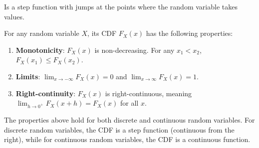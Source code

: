\documentclass[
  letterpaper,
  DIV=11,
  numbers=noendperiod]{scrreport}
\providecommand{\tightlist}{%
  \setlength{\itemsep}{0pt}\setlength{\parskip}{0pt}}
\theoremstyle{definition}
\theoremstyle{plain}
\theoremstyle{plain}
\theoremstyle{definition}
\theoremstyle{remark}
\begin{document}
Is a step function with jumps at the points where the random variable
takes values.

\begin{tcolorbox}[enhanced jigsaw, opacitybacktitle=0.6, bottomtitle=1mm, opacityback=0, toprule=.15mm, colbacktitle=quarto-callout-note-color!10!white, colback=white, left=2mm, title={Properties of Cumulative Distribution Functions}, breakable, rightrule=.15mm, leftrule=.75mm, titlerule=0mm, colframe=quarto-callout-note-color-frame, arc=.35mm, coltitle=black, toptitle=1mm, bottomrule=.15mm]

\label{properties-cdf}
For any random variable \(X\), its CDF \(F_X(x)\) has the following
properties:

\begin{enumerate}
\def\labelenumi{\arabic{enumi}.}
\tightlist
\item
  \textbf{Monotonicity}: \(F_X(x)\) is non-decreasing. For any
  \(x_1 < x_2\), \(F_X(x_1) \le F_X(x_2)\).
\item
  \textbf{Limits}: \(\lim_{x \to -\infty} F_X(x) = 0\) and
  \(\lim_{x \to \infty} F_X(x) = 1\).
\item
  \textbf{Right-continuity}: \(F_X(x)\) is right-continuous, meaning
  \(\lim_{h \to 0^+} F_X(x+h) = F_X(x)\) for all \(x\).
\end{enumerate}

\end{tcolorbox}

The properties above hold for both discrete and continuous random
variables. For discrete random variables, the CDF is a step function
(continuous from the right), while for continuous random variables, the
CDF is a continuous function.
\end{document}
